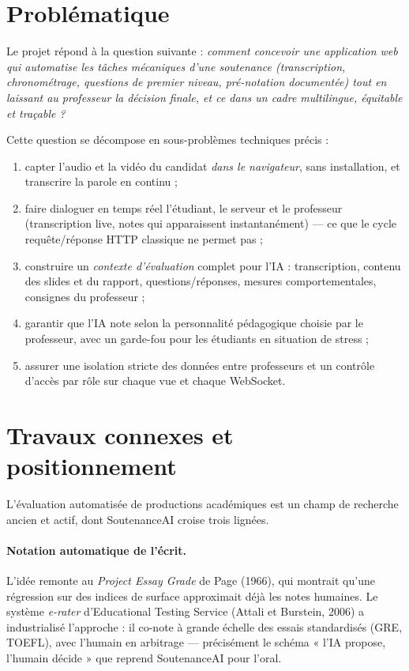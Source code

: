 \documentclass[12pt,a4paper]{report}
\begin{document}
\section{Problématique}

Le projet répond à la question suivante : \emph{comment concevoir une
application web qui automatise les tâches mécaniques d'une soutenance
(transcription, chronométrage, questions de premier niveau, pré-notation
documentée) tout en laissant au professeur la décision finale, et ce dans un
cadre multilingue, équitable et traçable ?}

Cette question se décompose en sous-problèmes techniques précis :
\begin{enumerate}[label=\alph*)]
  \item capter l'audio et la vidéo du candidat \emph{dans le navigateur}, sans
        installation, et transcrire la parole en continu ;
  \item faire dialoguer en temps réel l'étudiant, le serveur et le professeur
        (transcription live, notes qui apparaissent instantanément) --- ce que
        le cycle requête/réponse HTTP classique ne permet pas ;
  \item construire un \emph{contexte d'évaluation} complet pour l'IA :
        transcription, contenu des slides et du rapport, questions/réponses,
        mesures comportementales, consignes du professeur ;
  \item garantir que l'IA note selon la personnalité pédagogique choisie par le
        professeur, avec un garde-fou pour les étudiants en situation de stress ;
  \item assurer une isolation stricte des données entre professeurs et un
        contrôle d'accès par rôle sur chaque vue et chaque WebSocket.
\end{enumerate}

\section{Travaux connexes et positionnement}

L'évaluation automatisée de productions académiques est un champ de recherche
ancien et actif, dont SoutenanceAI croise trois lignées.

\paragraph{Notation automatique de l'écrit.} L'idée remonte au \emph{Project
Essay Grade} de Page (1966), qui montrait qu'une régression sur des indices de
surface approximait déjà les notes humaines. Le système \emph{e-rater}
d'Educational Testing Service (Attali et Burstein, 2006) a industrialisé
l'approche : il co-note à grande échelle des essais standardisés (GRE, TOEFL),
avec l'humain en arbitrage --- précisément le schéma « l'IA propose, l'humain
décide » que reprend SoutenanceAI pour l'oral.
\end{document}
